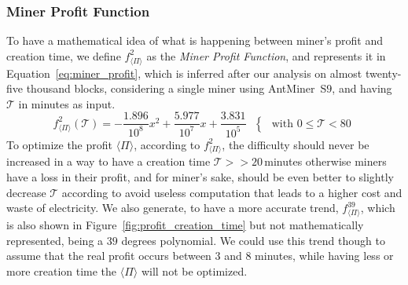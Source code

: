\documentclass[USenglish]{uit-thesis}
\begin{document}
\subsubsection{Miner Profit Function}
\label{sec:minerprofitfunction}
To have a mathematical idea of what is happening
between miner's profit and creation time,
we define $f^{2}_{\langle \Pi \rangle}$ as the
\emph{Miner Profit Function}, and represents it in Equation~\ref{eq:miner_profit},
which is inferred after our analysis on almost
twenty-five thousand blocks, considering a single
miner using AntMiner~S$9$, and having $\mathcal{T}$
in minutes as input.
\begin{equation}
\label{eq:miner_profit}
f^{2}_{\langle \Pi \rangle}(\mathcal{T}) = - \frac{1.896}{10^8} x^2 + \frac{5.977}{10^7} x + \frac{3.831}{10^5} \mbox{ }\begin{cases} \mbox{ with } 0 \leq \mathcal{T} < 80 \end{cases}
\end{equation}
To optimize the profit $\langle \Pi \rangle$, according
to $f^{2}_{\langle \Pi \rangle}$, the
difficulty should never be increased in a way to
have a creation time $\mathcal{T} >> 20$\,minutes otherwise
miners have a loss in their profit,
and for miner's sake, should be even better to slightly
decrease $\mathcal{T}$ according to avoid
useless computation that leads to a higher cost and waste
of electricity.
We also generate, to have a more accurate trend, $f_{\langle \Pi \rangle}^{39}$,
which is also shown in Figure~\ref{fig:profit_creation_time} but
not mathematically represented, being a $39$ degrees polynomial.
We could use this trend though to assume that the real
profit occurs between $3$ and $8$ minutes,
while having less or more creation time the
$\langle \Pi \rangle$ will not be optimized.
\end{document}
